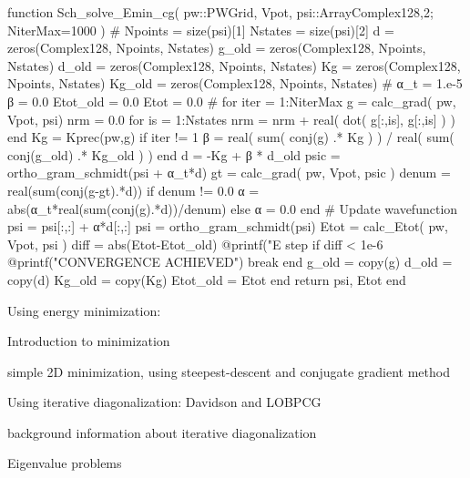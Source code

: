 \begin{juliacode}
function Sch_solve_Emin_cg( pw::PWGrid, Vpot, psi::Array{Complex128,2};
                            NiterMax=1000 )
  #
  Npoints = size(psi)[1]
  Nstates = size(psi)[2]
  d = zeros(Complex128, Npoints, Nstates)
  g_old  = zeros(Complex128, Npoints, Nstates)
  d_old  = zeros(Complex128, Npoints, Nstates)
  Kg     = zeros(Complex128, Npoints, Nstates)
  Kg_old = zeros(Complex128, Npoints, Nstates)
  #
  α_t = 1.e-5
  β = 0.0
  Etot_old = 0.0
  Etot = 0.0
  #
  for iter = 1:NiterMax
    g = calc_grad( pw, Vpot,  psi)
    nrm = 0.0
    for is = 1:Nstates
      nrm = nrm + real( dot( g[:,is], g[:,is] ) )
    end
    Kg = Kprec(pw,g)
    if iter != 1
      β = real( sum( conj(g) .* Kg ) ) / real( sum( conj(g_old) .* Kg_old ) )
    end
    d = -Kg + β * d_old
    psic = ortho_gram_schmidt(psi + α_t*d)
    gt = calc_grad( pw, Vpot, psic )
    denum = real(sum(conj(g-gt).*d))
    if denum != 0.0
      α = abs(α_t*real(sum(conj(g).*d))/denum)
    else
      α = 0.0
    end
    # Update wavefunction
    psi = psi[:,:] + α*d[:,:]
    psi = ortho_gram_schmidt(psi)
    Etot = calc_Etot( pw, Vpot, psi )
    diff = abs(Etot-Etot_old)
    @printf("E step %
    if diff < 1e-6
      @printf("CONVERGENCE ACHIEVED\n")
      break
    end
    g_old = copy(g)
    d_old = copy(d)
    Kg_old = copy(Kg)
    Etot_old = Etot
  end
  return psi, Etot
end
\end{juliacode}


{\color{red}
Using energy minimization:

Introduction to minimization

simple 2D minimization, using steepest-descent and conjugate gradient
method

Using iterative diagonalization: Davidson and LOBPCG

background information about iterative diagonalization

Eigenvalue problems

}

